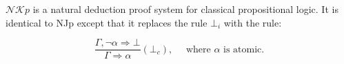 \documentclass[12pt]{article}
\begin{document}
$\mathcal{NK}p$ is a natural deduction proof system for classical propositional logic.  It is identical to NJp except that it replaces the rule $\bot_i$ with the rule:

$$\frac{\Gamma,\neg\alpha\Rightarrow\bot}{\Gamma\Rightarrow\alpha}(\bot_c),\quad \text{ where }\alpha\text{ is atomic}.$$
\end{document}
